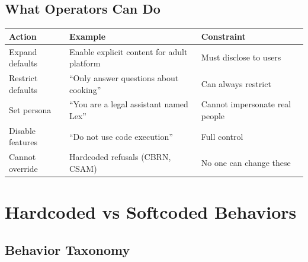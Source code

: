 \documentclass[11pt,a4paper]{article}
\begin{document}
\subsection{What Operators Can Do}

\begin{center}
\begin{tabular}{L{4cm}L{5cm}L{5cm}}
\toprule
\textbf{Action} & \textbf{Example} & \textbf{Constraint} \\
\midrule
Expand defaults & Enable explicit content for adult platform & Must disclose to users \\
Restrict defaults & ``Only answer questions about cooking'' & Can always restrict \\
Set persona & ``You are a legal assistant named Lex'' & Cannot impersonate real people \\
Disable features & ``Do not use code execution'' & Full control \\
Cannot override & Hardcoded refusals (CBRN, CSAM) & No one can change these \\
\bottomrule
\end{tabular}
\end{center}

\section{Hardcoded vs Softcoded Behaviors}

\subsection{Behavior Taxonomy}
\end{document}
